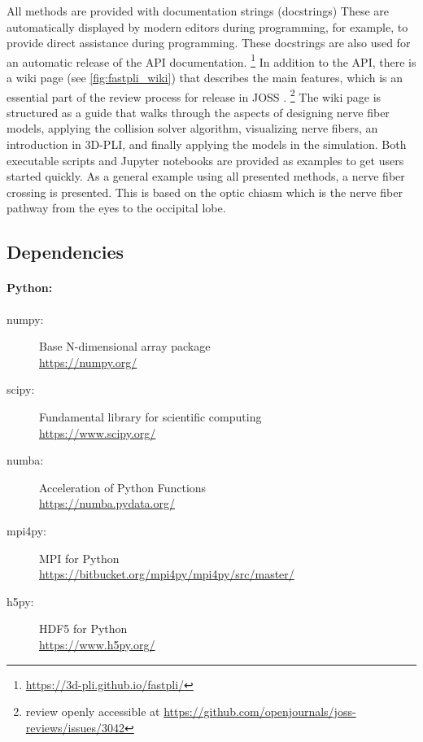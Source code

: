 %
All methods are provided with documentation strings (docstrings)
These are automatically displayed by modern editors during programming, for example, to provide direct assistance during programming.
These docstrings are also used for an automatic release of the \ac{API} documentation.
\footnote{\url{https://3d-pli.github.io/fastpli/}}
In addition to the API, there is a wiki page (see \cref{fig:fastpli_wiki}) that describes the main features, which is an essential part of the review process for release in \ac{JOSS} \cite{Matuschke2021}. 
\footnote{review openly accessible at \url{https://github.com/openjournals/joss-reviews/issues/3042}}
The wiki page is structured as a guide that walks through the aspects of designing nerve fiber models, applying the collision solver algorithm, visualizing nerve fibers, an introduction in \ac{3D-PLI}, and finally applying the models in the simulation.
Both executable \python{} scripts and Jupyter notebooks are provided as examples to get users started quickly.
As a general example using all presented methods, a nerve fiber crossing is presented.
This is based on the optic chiasm which is the nerve fiber pathway from the eyes to the occipital lobe.
%
%
%
\subsection{Dependencies}
%
\paragraph{Python:}
\begin{description}
\item[numpy:] Base N-dimensional array package \cite{2019arXiv190710121V}\\
\url{https://numpy.org/}
\item[scipy:] Fundamental library for scientific computing \cite{2019arXiv190710121V}\\
\url{https://www.scipy.org/}
\item[numba:] Acceleration of Python Functions \cite{Lam2015}\\
\url{https://numba.pydata.org/}
\item[mpi4py:] MPI for Python \cite{Dalcn2005, Dalcn2008, Dalcin2011}\\
\url{https://bitbucket.org/mpi4py/mpi4py/src/master/}
\item[h5py:] HDF5 for Python \cite{collette_python_hdf5_2014, hdf5}\\
\url{https://www.h5py.org/}
\end{description}
%
